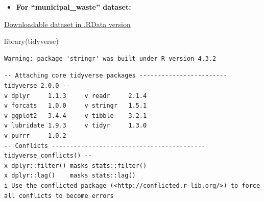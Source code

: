 \documentclass[
  11pt,
  a4paper,
  DIV=11,
  numbers=noendperiod]{scrartcl}
\newenvironment{Shaded}{\begin{snugshade}}{\end{snugshade}}
\newcommand{\FunctionTok}[1]{\textcolor[rgb]{0.28,0.35,0.67}{#1}}
\newcommand{\NormalTok}[1]{\textcolor[rgb]{0.00,0.23,0.31}{#1}}
\providecommand{\tightlist}{%
  \setlength{\itemsep}{0pt}\setlength{\parskip}{0pt}}\usepackage{longtable,booktabs,array}
\begin{document}
\begin{itemize}
\tightlist
\item
  \textbf{For ``municipal\_waste'' dataset:}
\end{itemize}

\href{https://github.com/emu-hacettepe-analytics/emu660-spring2024-Dilara-pro/tree/main/project/data}{Downloadable
dataset in .RData version}

\begin{Shaded}
\begin{Highlighting}[]
\FunctionTok{library}\NormalTok{(tidyverse)}
\end{Highlighting}
\end{Shaded}

\begin{verbatim}
Warning: package 'stringr' was built under R version 4.3.2
\end{verbatim}

\begin{verbatim}
-- Attaching core tidyverse packages ------------------------ tidyverse 2.0.0 --
v dplyr     1.1.3     v readr     2.1.4
v forcats   1.0.0     v stringr   1.5.1
v ggplot2   3.4.4     v tibble    3.2.1
v lubridate 1.9.3     v tidyr     1.3.0
v purrr     1.0.2     
-- Conflicts ------------------------------------------ tidyverse_conflicts() --
x dplyr::filter() masks stats::filter()
x dplyr::lag()    masks stats::lag()
i Use the conflicted package (<http://conflicted.r-lib.org/>) to force all conflicts to become errors
\end{verbatim}
\end{document}
